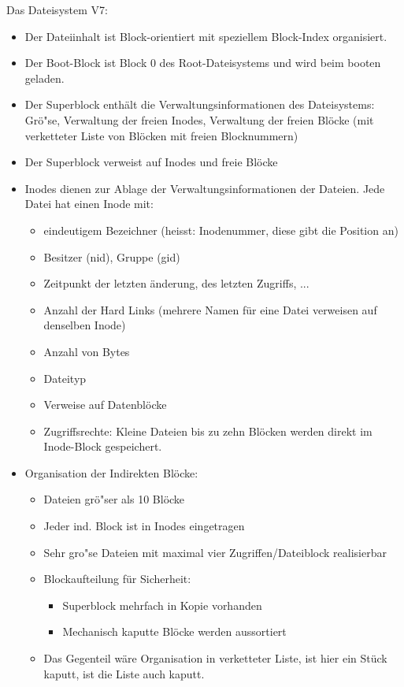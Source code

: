 \begin{answer}
  Das Dateisystem V7: 
  \begin{itemize}
  \item Der Dateiinhalt ist Block-orientiert mit speziellem Block-Index organisiert. 
  \item Der Boot-Block ist Block 0 des Root-Dateisystems und wird beim booten geladen. 
  \item Der Superblock enthält die Verwaltungsinformationen des Dateisystems: Grö"se, Verwaltung der freien Inodes, Verwaltung der freien Blöcke (mit verketteter Liste von Blöcken mit freien Blocknummern) 
  \item Der Superblock verweist auf Inodes und freie Blöcke
  \item Inodes dienen zur Ablage der Verwaltungsinformationen der Dateien. Jede Datei hat einen Inode mit:
    \begin{itemize}
    \item eindeutigem Bezeichner (heisst: Inodenummer, diese gibt die Position an) 
    \item Besitzer (nid), Gruppe (gid) 
    \item Zeitpunkt der letzten änderung, des letzten Zugriffs, ... 
    \item Anzahl der Hard Links (mehrere Namen für eine Datei verweisen auf denselben Inode) 
    \item Anzahl von Bytes 
    \item Dateityp 
    \item Verweise auf Datenblöcke 
    \item Zugriffsrechte: Kleine Dateien bis zu zehn Blöcken werden direkt im Inode-Block gespeichert.
    \end{itemize}

  \item Organisation der Indirekten Blöcke:
  \begin{itemize}
  \item Dateien grö"ser als 10 Blöcke
  \item Jeder ind. Block ist in Inodes eingetragen
  \item Sehr gro"se Dateien mit maximal vier Zugriffen/Dateiblock realisierbar
  \item Blockaufteilung für Sicherheit: 
  \begin{itemize}
  \item Superblock mehrfach in Kopie vorhanden
  \item Mechanisch kaputte Blöcke werden aussortiert
  \end{itemize}
  \item Das Gegenteil wäre Organisation in verketteter Liste, ist hier ein Stück kaputt, ist die Liste auch kaputt.
  \end{itemize}
  \end{itemize}
\end{answer}

